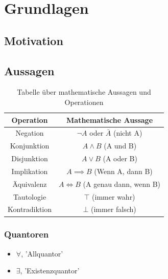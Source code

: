 \chapter{Grundlagen}

\section{Motivation}


\section{Aussagen}





\begin{table}[h!]
    \centering
    \renewcommand{\arraystretch}{1.5} %
    \begin{tabular}{|c|c|}
        \hline
        \textbf{Operation} & \textbf{Mathematische Aussage} \\
        \hline
        Negation & $\neg A$ oder $\bar A$ (nicht A) \\
        \hline
        Konjunktion & $A \land B$ (A und B) \\
        \hline
        Disjunktion & $A \lor B$ (A oder B) \\
        \hline
        Implikation & $A \implies B$ (Wenn A, dann B) \\
        \hline
        Äquivalenz & $A \iff B$ (A genau dann, wenn B) \\
        \hline
        Tautologie & $\top$ (immer wahr) \\
        \hline
        Kontradiktion & $\bot$ (immer falsch) \\
        \hline
    \end{tabular}
    \caption{Tabelle über mathematische Aussagen und Operationen}
\end{table}


\subsection{Quantoren}

\begin{itemize}
    \item $\forall$, 'Allquantor'
    \item $\exists$, 'Existenzquantor'
\end{itemize}

